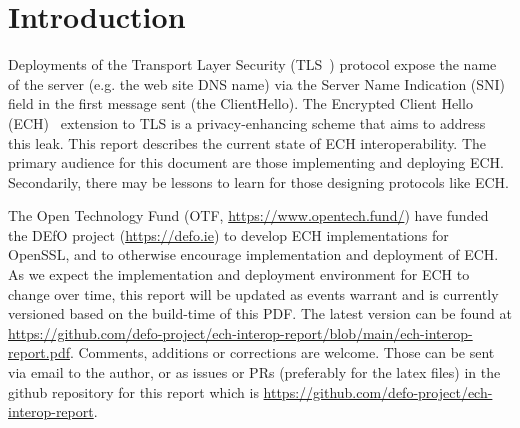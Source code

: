 \section{Introduction}

Deployments of the Transport Layer Security (TLS~\cite{rfc8446}) protocol
expose the name of the server (e.g. the web site DNS name) via the Server Name
Indication (SNI) field in the first message sent (the ClientHello).  The
Encrypted Client Hello (ECH)~\cite{draft-ietf-tls-esni} extension to TLS is a
privacy-enhancing scheme that aims to address this leak.
This report describes the current state of ECH interoperability.
The primary audience for this document are those implementing and
deploying ECH. Secondarily, there may be lessons to learn for those
designing protocols like ECH.

The Open Technology Fund (OTF, \url{https://www.opentech.fund/}) have
funded the DEfO project (\url{https://defo.ie}) to develop
ECH implementations for OpenSSL, and to otherwise encourage implementation
and deployment of ECH.
As we expect the implementation and deployment environment for ECH to change
over time, this report will be updated as events warrant and is currently
versioned based on the build-time of this PDF. The latest version can be found
at
\url{https://github.com/defo-project/ech-interop-report/blob/main/ech-interop-report.pdf}.
Comments, additions or corrections are welcome. Those can be sent via email to
the author, or as issues or PRs (preferably for the latex files) in the github
repository for this report which is
\url{https://github.com/defo-project/ech-interop-report}.
